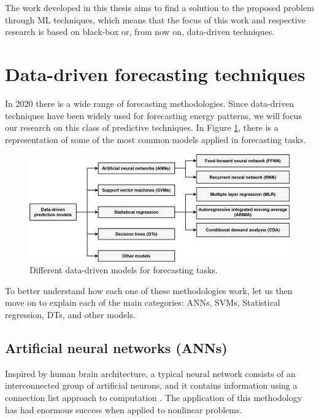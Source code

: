 The work developed in this thesis aims to find a solution to the proposed problem through \ac{ML} techniques, which means that the focus of this work and respective research is based on black-box or, from now on, data-driven techniques.

\section{Data-driven forecasting techniques\label{b}}

In 2020 there is a wide range of forecasting methodologies. Since data-driven techniques have been widely used for forecasting energy patterns, we will focus our research on this class of predictive techniques. In Figure \ref{datamodels}, there is a representation of some of the most common models applied in forecasting tasks.

\begin{figure}[h!]
    \centering
    \begin{center}
    \includegraphics[width=1\textwidth]{Images/data-drive prediction models.png}
    \caption{Different data-driven models for forecasting tasks.}
    \label{datamodels}
    \end{center}
\end{figure}

To better understand how each one of these methodologies work, let us then move on to explain each of the main categories: \acf{ANNs}, \acf{SVMs}, Statistical regression, \acf{DTs}, and other models.


\subsection{Artificial neural networks (ANNs)}

Inspired by human brain architecture, a typical neural network consists of an interconnected group of artificial neurons, and it contains information using a connection list approach to computation \cite{ann1}. The application of this methodology has had enormous success when applied to nonlinear problems.

